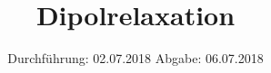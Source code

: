 

\subject{V48}
\title{Dipolrelaxation }
\date{
  Durchführung: 02.07.2018
  \hspace{3em}
  Abgabe: 06.07.2018
}



\maketitle
\thispagestyle{empty}
\tableofcontents
\newpage
\setcounter{page}{1}





\printbibliography


